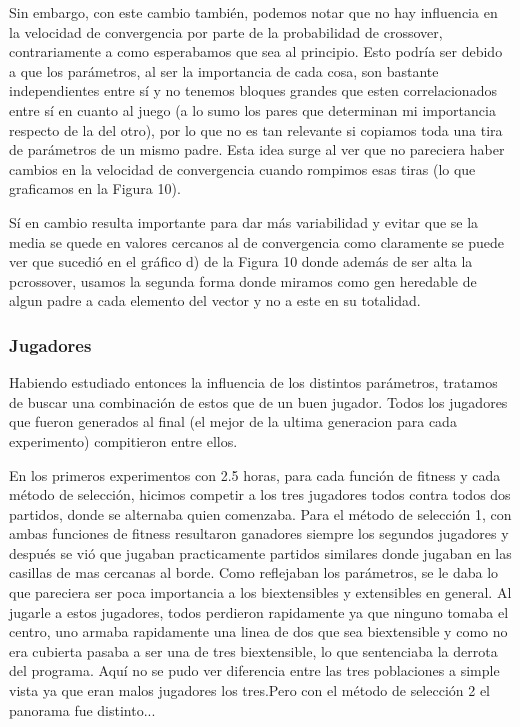 \documentclass[A4paper,oneside,fleqn,11pt]{article}
\theoremstyle{definition}
\begin{document}
Sin embargo, con este cambio también, podemos notar que no hay influencia en la velocidad de convergencia por parte de la probabilidad de crossover, contrariamente a como esperabamos que sea al principio. Esto podría ser debido a que los parámetros, al ser la importancia de cada cosa, son bastante independientes entre sí y no tenemos bloques grandes que esten correlacionados entre sí en cuanto al juego (a lo sumo los pares que determinan mi importancia respecto de la del otro), por lo que no es tan relevante si copiamos toda una tira de parámetros de un mismo padre. Esta idea surge al ver que no pareciera haber cambios en la velocidad de convergencia cuando rompimos esas tiras (lo que graficamos en la Figura 10).

Sí en cambio resulta importante para dar más variabilidad y evitar que se la media se quede en valores cercanos al de convergencia como claramente se puede ver que sucedió en el gráfico d) de la Figura 10 donde además de ser alta la pcrossover, usamos la segunda forma donde miramos como gen heredable de algun padre a cada elemento del vector y no a este en su totalidad.

\subsubsection{Jugadores}
Habiendo estudiado entonces la influencia de los distintos parámetros, tratamos de buscar una combinación de estos que de un buen jugador. Todos los jugadores que fueron generados al final (el mejor de la ultima generacion para cada experimento) compitieron entre ellos.

En los primeros experimentos con 2.5 horas, para cada función de fitness y cada método de selección, hicimos competir a los tres jugadores todos contra todos dos partidos, donde se alternaba quien comenzaba. Para el método de selección 1, con ambas funciones de fitness resultaron ganadores siempre los segundos jugadores y después se vió que jugaban practicamente partidos similares donde jugaban en las casillas de mas cercanas al borde. Como reflejaban los parámetros, se le daba lo que pareciera ser poca importancia a los biextensibles y extensibles en general. Al jugarle a estos jugadores, todos perdieron rapidamente ya que ninguno tomaba el centro, uno armaba rapidamente una linea de dos que sea biextensible y como no era cubierta pasaba a ser una de tres biextensible, lo que sentenciaba la derrota del programa. Aquí no se pudo ver diferencia entre las tres poblaciones a simple vista ya que eran malos jugadores los tres.Pero con el método de selección 2 el panorama fue distinto...
\end{document}
